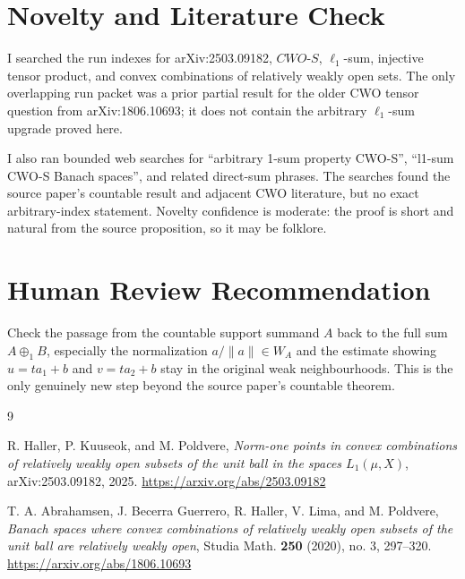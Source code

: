 \documentclass[11pt]{article}
\newcommand{\CWOS}{\textit{CWO-S}}
\begin{document}
\section*{Novelty and Literature Check}

I searched the run indexes for arXiv:2503.09182, \(\CWOS\), \(\ell_1\)-sum,
injective tensor product, and convex combinations of relatively weakly open
sets.  The only overlapping run packet was a prior partial result for the
older CWO tensor question from arXiv:1806.10693; it does not contain the
arbitrary \(\ell_1\)-sum upgrade proved here.

I also ran bounded web searches for ``arbitrary 1-sum property CWO-S'',
``l1-sum CWO-S Banach spaces'', and related direct-sum phrases.  The searches
found the source paper's countable result and adjacent CWO literature, but no
exact arbitrary-index statement.  Novelty confidence is moderate: the proof is
short and natural from the source proposition, so it may be folklore.

\section*{Human Review Recommendation}

Check the passage from the countable support summand \(A\) back to the full
sum \(A\oplus_1B\), especially the normalization \(a/\|a\|\in W_A\) and the
estimate showing \(u=ta_1+b\) and \(v=ta_2+b\) stay in the original weak
neighbourhoods.  This is the only genuinely new step beyond the source
paper's countable theorem.

\begin{thebibliography}{9}

R. Haller, P. Kuuseok, and M. Poldvere,
\emph{Norm-one points in convex combinations of relatively weakly open subsets
of the unit ball in the spaces \(L_1(\mu,X)\)},
arXiv:2503.09182, 2025.
\url{https://arxiv.org/abs/2503.09182}

T. A. Abrahamsen, J. Becerra Guerrero, R. Haller, V. Lima, and M. Poldvere,
\emph{Banach spaces where convex combinations of relatively weakly open
subsets of the unit ball are relatively weakly open},
Studia Math. \textbf{250} (2020), no. 3, 297--320.
\url{https://arxiv.org/abs/1806.10693}

\end{thebibliography}
\end{document}
